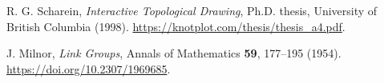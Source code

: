 R. G. Scharein,
\emph{Interactive Topological Drawing},
Ph.D. thesis, University of British Columbia (1998).
\url{https://knotplot.com/thesis/thesis_a4.pdf}.

J. Milnor,
\emph{Link Groups},
Annals of Mathematics \textbf{59}, 177--195 (1954).
\url{https://doi.org/10.2307/1969685}.
